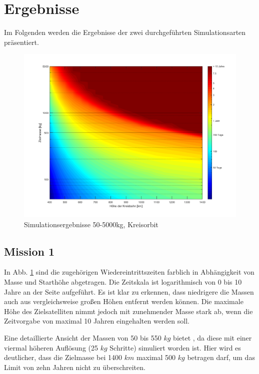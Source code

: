 \newpage

\section{Ergebnisse}

	Im Folgenden werden die Ergebnisse der zwei durchgeführten Simulationsarten präsentiert.
\begin{figure}[h]
\centering
\includegraphics[width=1.00\textwidth]{./graphics/GMAT/GMAT_Mass_over_Height.png}
\caption{Simulationsergebnisse 50-5000kg, Kreisorbit}
\label{fig:GMAT_Mass_over_Height}
\end{figure}

\subsection{Mission 1}

	In Abb. \ref{fig:GMAT_Mass_over_Height} sind die zugehörigen Wiedereintrittszeiten farblich in Abhängigkeit von Masse und Starthöhe abgetragen. Die Zeitskala ist logarithmisch von 0 bis 10 Jahre an der Seite aufgeführt.  
Es ist klar zu erkennen, dass niedrigere die Massen auch aus vergleichsweise großen Höhen entfernt werden können. Die maximale Höhe des Zielsatelliten nimmt jedoch mit zunehmender Masse stark ab, wenn die Zeitvorgabe von maximal 10 Jahren eingehalten werden soll.

	Eine detaillierte Ansicht der Massen von 50 bis 550 $kg$ bietet , da diese mit einer viermal höheren Auflösung (25 $kg$ Schritte) simuliert worden ist. Hier wird es deutlicher, dass die Zielmasse bei 1400 $km$ maximal 500 $kg$ betragen darf, um das Limit von zehn Jahren nicht zu überschreiten.

